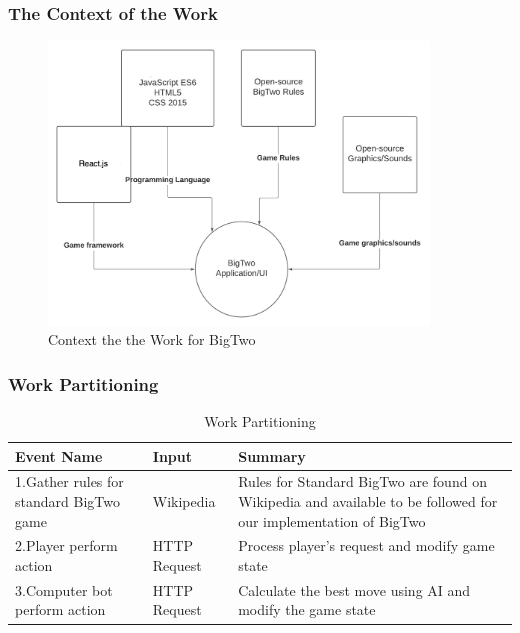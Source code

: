 \documentclass[12pt, titlepage]{article}
\begin{document}
\FloatBarrier
\subsubsection{The Context of the Work}
\bigskip
\begin{figure}[h!]
    \centering
    \includegraphics[width=0.9\textwidth]{context_of_work.png}
    \caption{Context the the Work for BigTwo}
    \label{fig: context of work}
\end{figure}

\FloatBarrier
\subsubsection{Work Partitioning}
\newpage
\begin{table}[h!]
\begin{center}
\begin{tabularx}{\textwidth}{ |X|X|X| } 
\hline
Event Name & Input  & Summary\\ 
\hline
1.Gather rules for standard BigTwo game & Wikipedia & Rules for Standard BigTwo are found on Wikipedia and
available to be followed for our implementation of BigTwo\\
\hline
2.Player perform action & HTTP Request & Process player's request and modify game state\\
\hline
3.Computer bot perform action & HTTP Request & Calculate the best move using AI and modify the game state\\
\hline
\end{tabularx}
\end{center}
\caption{Work Partitioning}
\label{table:1}
\end{table}
\end{document}
